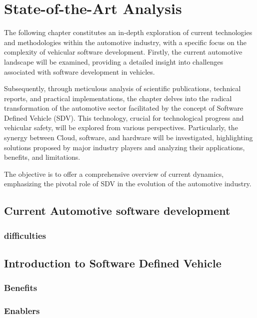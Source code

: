 

\chapter{State-of-the-Art Analysis} \label{ch:state-of-the-ArtAnalysis}
The following chapter constitutes an in-depth exploration of current technologies and methodologies within the automotive industry, with a specific focus on the complexity of vehicular software development. Firstly, the current automotive landscape will be examined, providing a detailed insight into challenges associated with software development in vehicles.

Subsequently, through meticulous analysis of scientific publications, technical reports, and practical implementations, the chapter delves into the radical transformation of the automotive sector facilitated by the concept of Software Defined Vehicle (SDV). This technology, crucial for technological progress and vehicular safety, will be explored from various perspectives. Particularly, the synergy between Cloud, software, and hardware will be investigated, highlighting solutions proposed by major industry players and analyzing their applications, benefits, and limitations.

The objective is to offer a comprehensive overview of current dynamics, emphasizing the pivotal role of SDV in the evolution of the automotive industry.

\section{Current Automotive software development}
\subsection{difficulties}
\section{Introduction to Software Defined Vehicle}
\subsection{Benefits}
\subsection{Enablers}
